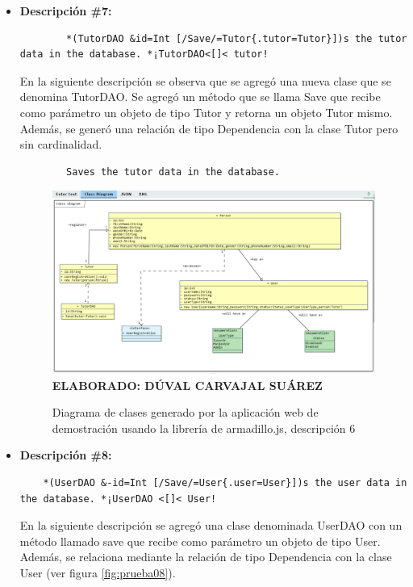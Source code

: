 \begin{itemize}
	\item \textbf{Descripción \#7:}
	\begin{lstlisting}
		*(TutorDAO &id=Int [/Save/=Tutor{.tutor=Tutor}])s the tutor data in the database. *¡TutorDAO<[]< tutor! \end{lstlisting}
	
	En la siguiente descripción se observa que se agregó una nueva clase que se denomina TutorDAO. Se agregó un método que se llama Save que recibe como parámetro un objeto de tipo Tutor y retorna un objeto Tutor mismo. Además, se generó una relación de tipo Dependencia con la clase Tutor pero sin cardinalidad.
	\begin{lstlisting}
		Saves the tutor data in the database. \end{lstlisting}
	
	\begin{figure}[h!]
		\caption{Diagrama de clases generado por la aplicación web de demostración usando la librería de armadillo.js, descripción 6}
		\includegraphics[width=15cm]{img/prueba07.png}
		\label{fig:prueba07}
		\textbf{\\ ELABORADO: DÚVAL CARVAJAL SUÁREZ}
	\end{figure}
	
	\item \textbf{Descripción \#8:}
	\begin{lstlisting}
	*(UserDAO &-id=Int [/Save/=User{.user=User}])s the user data in the database. *¡UserDAO <[]< User! \end{lstlisting}

	En la siguiente descripción se agregó una clase denominada UserDAO con un método llamado save que recibe como parámetro un objeto de tipo User. Además, se relaciona mediante la relación de tipo Dependencia con la clase User (ver figura \ref{fig:prueba08}).	
	

\end{itemize}
